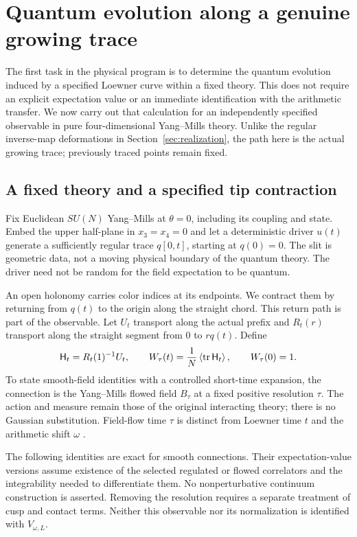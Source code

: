 \section{Quantum evolution along a genuine growing trace}
\label{sec:growing-trace}

The first task in the physical program is to determine the quantum
evolution induced by a specified Loewner curve within a fixed theory.
This does not require an explicit expectation value or an immediate
identification with the arithmetic transfer. We now carry out that
calculation for an independently specified observable in pure
four-dimensional Yang--Mills theory. Unlike the regular inverse-map
deformations in Section~\ref{sec:realization}, the path here is the
actual growing trace; previously traced points remain fixed.

\subsection{A fixed theory and a specified tip contraction}

Fix Euclidean $SU(N)$ Yang--Mills at $\theta=0$, including its
coupling and state. Embed the upper half-plane in $x_3=x_4=0$ and
let a deterministic driver $u(t)$ generate a sufficiently regular
trace $q[0,t]$, starting at $q(0)=0$. The slit is geometric data,
not a moving physical boundary of the quantum theory. The driver
need not be random for the field expectation to be quantum.

An open holonomy carries color indices at its endpoints. We
contract them by returning from $q(t)$ to the origin along the
straight chord. This return path is part of the observable. Let
$U_t$ transport along the actual prefix and $R_t(r)$ transport
along the straight segment from $0$ to $r q(t)$. Define
\begin{equation}\label{eq:main-trace-observable}
 \mathsf H_t=R_t(1)^{-1}U_t,\qquad
 W_\tau(t)=\frac1N\left\langle\operatorname{tr}\mathsf H_t\right\rangle,\qquad W_\tau(0)=1.
\end{equation}
To state smooth-field identities with a controlled short-time
expansion, the connection is the Yang--Mills flowed field $B_\tau$
at a fixed positive resolution $\tau$. The action and measure
remain those of the original interacting theory; there is no
Gaussian substitution. Field-flow time $\tau$ is distinct from
Loewner time $t$ and the arithmetic shift $\omega$
\cite{LuscherFlow,LuscherWeiszFlow}.

The following identities are exact for smooth connections. Their
expectation-value versions assume existence of the selected
regulated or flowed correlators and the integrability needed to
differentiate them. No nonperturbative continuum construction is
asserted. Removing the resolution requires a separate treatment
of cusp and contact terms. Neither this observable nor its
normalization is identified with $V_{\omega,L}$.

